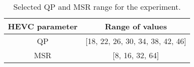 \begin{table}[!tb]
    \centering
    \caption[Selected QP and MSR range for the experiment]
    {Selected QP and MSR range for the experiment.}
    \begin{tabular}{|c|c|}
        \hline
        HEVC parameter & Range of values \\
        \hline
        \hline
        QP & [18, 22, 26, 30, 34, 38, 42, 46] \\
        \hline
        MSR & [8, 16, 32, 64] \\
        \hline
    \end{tabular}
    \label{tab:qp_msr_range}
\end{table}